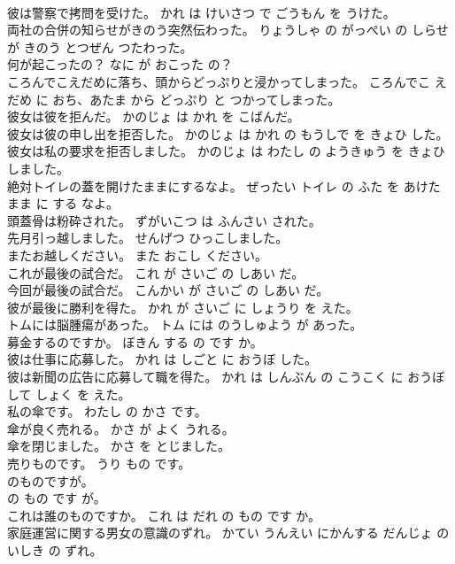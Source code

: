\documentclass[8pt]{extreport}
\begin{document}
\begin{CJK}{UTF8}{min}
\\	彼は警察で拷問を受けた。	かれ は けいさつ で ごうもん を うけた。	
\\	両社の合併の知らせがきのう突然伝わった。	りょうしゃ の がっぺい の しらせ が きのう とつぜん つたわった。	
\\	何が起こったの？	なに が おこった の？	
\\	ころんでこえだめに落ち、頭からどっぷりと浸かってしまった。	ころんでこ え だめ に おち、あたま から どっぷり と つかってしまった。	
\\	彼女は彼を拒んだ。	かのじょ は かれ を こばんだ。	
\\	彼女は彼の申し出を拒否した。	かのじょ は かれ の もうしで を きょひ した。	
\\	彼女は私の要求を拒否しました。	かのじょ は わたし の ようきゅう を きょひ しました。	
\\	絶対トイレの蓋を開けたままにするなよ。	ぜったい トイレ の ふた を あけた まま に する なよ。	
\\	頭蓋骨は粉砕された。	ずがいこつ は ふんさい された。	
\\	先月引っ越しました。	せんげつ ひっこしました。	
\\	またお越しください。	また おこし ください。	
\\	これが最後の試合だ。	これ が さいご の しあい だ。	
\\	今回が最後の試合だ。	こんかい が さいご の しあい だ。	
\\	彼が最後に勝利を得た。	かれ が さいご に しょうり を えた。	
\\	トムには脳腫瘍があった。	トム には のうしゅよう が あった。	
\\	募金するのですか。	ぼきん する の です か。	
\\	彼は仕事に応募した。	かれ は しごと に おうぼ した。	
\\	彼は新聞の広告に応募して職を得た。	かれ は しんぶん の こうこく に おうぼ して しょく を えた。	
\\	私の傘です。	わたし の かさ です。	
\\	傘が良く売れる。	かさ が よく うれる。	
\\	傘を閉じました。	かさ を とじました。	
\\	売りものです。	うり もの です。	
\\	のものですが。	
\\	の もの です が。	
\\	これは誰のものですか。	これ は だれ の もの です か。	
\\	家庭運営に関する男女の意識のずれ。	かてい うんえい にかんする だんじょ の いしき の ずれ。	

\end{CJK}
\end{document}
